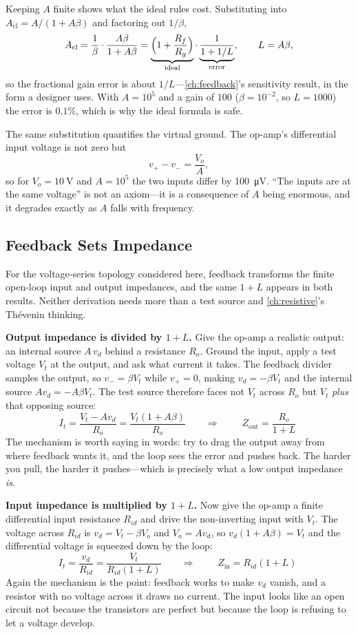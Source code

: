 Keeping \(A\) finite shows what the ideal rules cost. Substituting into
\(A_{\mathrm{cl}}=A/(1+A\beta)\) and factoring out \(1/\beta\),
\[
A_{\mathrm{cl}}=\frac{1}{\beta}\cdot\frac{A\beta}{1+A\beta}
=\underbrace{\Bigl(1+\frac{R_f}{R_g}\Bigr)}_{\text{ideal}}
\cdot\underbrace{\frac{1}{1+1/L}}_{\text{error}},
\qquad L=A\beta ,
\]
so the fractional gain error is about \(1/L\)---\cref{ch:feedback}'s sensitivity
result, in the form a designer uses. With \(A=10^5\) and a gain of \(100\)
(\(\beta=10^{-2}\), so \(L=1000\)) the error is \(0.1\%\), which is why the ideal
formula is safe.

The same substitution quantifies the virtual ground. The op-amp's differential input
voltage is not zero but
\[
v_+-v_-=\frac{V_o}{A},
\]
so for \(V_o=\SI{10}{\volt}\) and \(A=10^5\) the two inputs differ by
\SI{100}{\micro\volt}. ``The inputs are at the same voltage'' is not an axiom---it is
a consequence of \(A\) being enormous, and it degrades exactly as \(A\) falls with
frequency.

\subsection{Feedback Sets Impedance}
\label{sec:feedbackz}
For the voltage-series topology considered here, feedback transforms the finite
open-loop input and output impedances, and the same \(1+L\) appears in both results.
Neither derivation needs more than a test source and \cref{ch:resistive}'s
Th\'evenin thinking.

\textbf{Output impedance is divided by \(1+L\).} Give the op-amp a realistic output:
an internal source \(A\,v_d\) behind a resistance \(R_o\). Ground the input, apply a
test voltage \(V_t\) at the output, and ask what current it takes. The feedback
divider samples the output, so \(v_-=\beta V_t\) while \(v_+=0\), making
\(v_d=-\beta V_t\) and the internal source \(A v_d=-A\beta V_t\). The test source
therefore faces not \(V_t\) across \(R_o\) but \(V_t\) \emph{plus} that opposing
source:
\[
I_t=\frac{V_t-Av_d}{R_o}=\frac{V_t\left(1+A\beta\right)}{R_o}
\qquad\Longrightarrow\qquad
\boxed{\;Z_{\mathrm{out}}=\frac{R_o}{1+L}\;}
\]
The mechanism is worth saying in words: try to drag the output away from where
feedback wants it, and the loop sees the error and pushes back. The harder you pull,
the harder it pushes---which is precisely what a low output impedance \emph{is}.

\textbf{Input impedance is multiplied by \(1+L\).} Now give the op-amp a finite
differential input resistance \(R_{id}\) and drive the non-inverting input with
\(V_t\). The voltage across \(R_{id}\) is \(v_d=V_t-\beta V_o\) and \(V_o=Av_d\), so
\(v_d\left(1+A\beta\right)=V_t\) and the differential voltage is squeezed down by the
loop:
\[
I_t=\frac{v_d}{R_{id}}=\frac{V_t}{R_{id}\left(1+L\right)}
\qquad\Longrightarrow\qquad
\boxed{\;Z_{\mathrm{in}}=R_{id}\left(1+L\right)\;}
\]
Again the mechanism is the point: feedback works to make \(v_d\) vanish, and a
resistor with no voltage across it draws no current. The input looks like an open
circuit not because the transistors are perfect but because the loop is refusing to
let a voltage develop.

